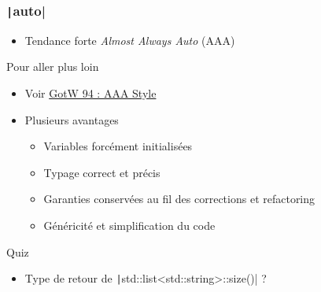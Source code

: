 \documentclass[C++.tex]{subfiles}
\begin{document}
\begin{frame}[fragile]
	\frametitle{\texttt|auto|}
	\begin{itemize}
		\item Tendance forte \textit{Almost Always Auto} (AAA)
	\end{itemize}

	\begin{block}{Pour aller plus loin}
		\begin{itemize}
			\item Voir \href{https://herbsutter.com/2013/08/12/gotw-94-solution-aaa-style-almost-always-auto/}{GotW 94 : AAA Style}
		\end{itemize}
	\end{block}

	\begin{itemize}
		\item Plusieurs avantages
		\begin{itemize}
			\item Variables forcément initialisées
			\item Typage correct et précis
			\item Garanties conservées au fil des corrections et refactoring
			\item Généricité et simplification du code
		\end{itemize}
	\end{itemize}

	\pause

	\begin{block}{Quiz}
		\begin{itemize}
			\item Type de retour de \texttt|std::list<std::string>::size()| ?
		\end{itemize}
	\end{block}
\end{frame}
\end{document}
